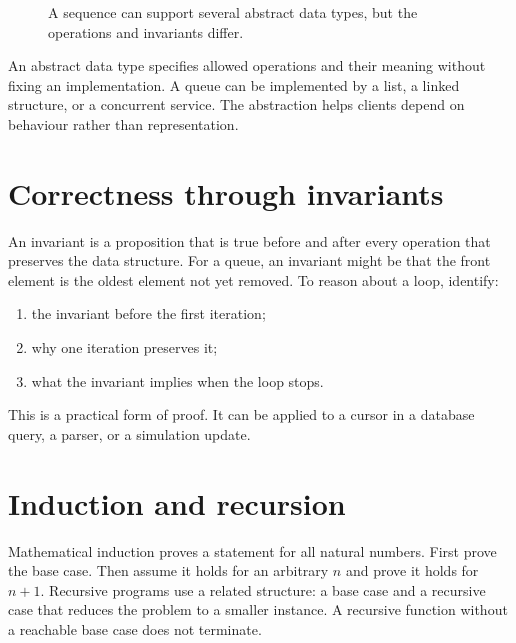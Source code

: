 \begin{figure}[H]
\centering
{}
\caption{A sequence can support several abstract data types, but the operations and invariants differ.}
\label{fig:data-structures}
\end{figure}

An abstract data type specifies allowed operations and their meaning without fixing an implementation. A queue can be implemented by a list, a linked structure, or a concurrent service. The abstraction helps clients depend on behaviour rather than representation.

\section{Correctness through invariants}
An invariant is a proposition that is true before and after every operation that preserves the data structure. For a queue, an invariant might be that the front element is the oldest element not yet removed. To reason about a loop, identify:
\begin{enumerate}
\item the invariant before the first iteration;
\item why one iteration preserves it;
\item what the invariant implies when the loop stops.
\end{enumerate}
This is a practical form of proof. It can be applied to a cursor in a database query, a parser, or a simulation update.

\section{Induction and recursion}
Mathematical induction proves a statement for all natural numbers. First prove the base case. Then assume it holds for an arbitrary $n$ and prove it holds for $n+1$. Recursive programs use a related structure: a base case and a recursive case that reduces the problem to a smaller instance. A recursive function without a reachable base case does not terminate.

